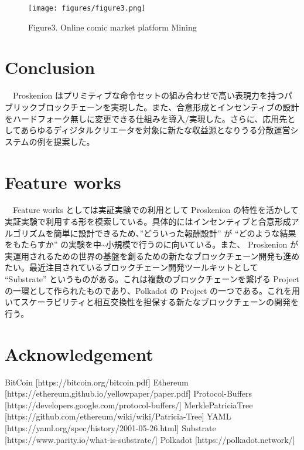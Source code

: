 \begin{figure}
\centering
\texttt{[image: figures/figure3.png]}
\caption{Figure3. Online comic market platform Mining}
\end{figure}

\hypertarget{conclusion}{%
\section{Conclusion}\label{conclusion}}

　Proskenion
はプリミティブな命令セットの組み合わせで高い表現力を持つパブリックブロックチェーンを実現した。また、合意形成とインセンティブの設計をハードフォーク無しに変更できる仕組みを導入/実現した。さらに、応用先としてあらゆるディジタルクリエータを対象に新たな収益源となりうる分散運営システムの例を提案した。

\hypertarget{feature-works}{%
\section{Feature works}\label{feature-works}}

　Feature works としては実証実験での利用として Proskenion
の特性を活かして実証実験で利用する形を模索している。具体的にはインセンティブと合意形成アルゴリズムを簡単に設計できるため、''どういった報酬設計''
が ``どのような結果をもたらすか''
の実験を中\textasciitilde 小規模で行うのに向いている。また、 Proskenion
が実運用されるための世界の基盤を創るための新たなブロックチェーン開発も進めたい。最近注目されているブロックチェーン開発ツールキットとして
``Substrate\cite{6}''
というものがある。これは複数のブロックチェーンを繋げる Project
の一環として作られたものであり、Polkadot\cite{7} の Project
の一つである。これを用いてスケーラビリティと相互交換性を担保する新たなブロックチェーンの開発を行う。

\hypertarget{acknowledgement}{%
\section{Acknowledgement}\label{acknowledgement}}


\begin{thebibliography}{9}
 BitCoin {[}https://bitcoin.org/bitcoin.pdf{]}
  Ethereum {[}https://ethereum.github.io/yellowpaper/paper.pdf{]}
  Protocol-Buffers {[}https://developers.google.com/protocol-buffers/{]}
 MerklePatriciaTree
{[}https://github.com/ethereum/wiki/wiki/Patricia-Tree{]}
  YAML {[}https://yaml.org/spec/history/2001-05-26.html{]}
  Substrate {[}https://www.parity.io/what-is-substrate/{]}
  Polkadot {[}https://polkadot.network/{]}
\end{thebibliography}
